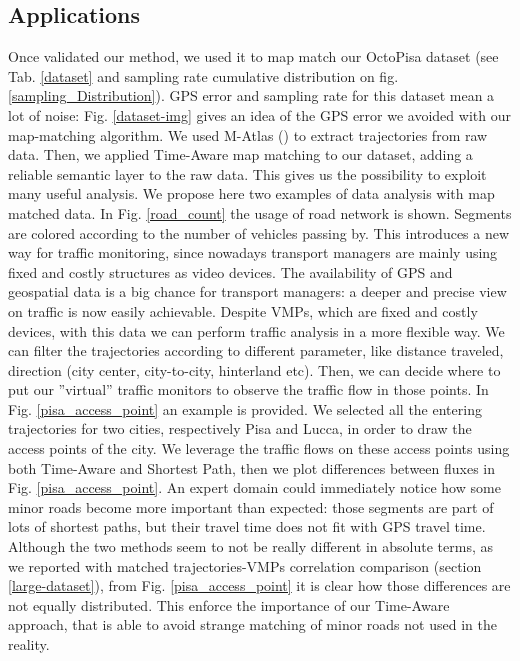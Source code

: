 \documentclass[5p]{elsarticle}
\begin{document}
\subsection{Applications}

Once validated our method, we used it to map match our OctoPisa dataset (see Tab. \ref{dataset} and sampling rate cumulative distribution on fig.
\ref{sampling_Distribution}). GPS error and sampling rate for this dataset mean a lot of noise: Fig. \ref{dataset-img} gives an idea of the GPS error we avoided with our map-matching algorithm.
We used M-Atlas (\cite{trasarti2010exploring}) to extract trajectories from raw data. Then, we applied Time-Aware map matching to our dataset, adding a reliable semantic layer to the raw data. This gives us the possibility to exploit many useful analysis. 
We propose here two examples of data analysis with map matched data.
In Fig. \ref{road_count} the usage of road network is shown. Segments are colored according to the number of vehicles passing by. 
This introduces a new way for traffic monitoring, since nowadays transport managers are mainly using fixed and costly structures as video devices. 
The availability of GPS and geospatial data is a big chance for transport managers: a deeper and precise view on traffic is now easily achievable. 
Despite VMPs, which are fixed and costly devices,
with this data we can perform traffic analysis in a more flexible way. We can filter the trajectories according to different parameter, like distance traveled, direction (city center, city-to-city, hinterland etc). Then,
we can decide where to put our ''virtual'' traffic monitors to observe the traffic flow in those points. In Fig. \ref{pisa_access_point}  an 
example is provided. 
We selected all the entering trajectories for two cities, 
respectively Pisa and Lucca, in order to draw the access points of the city. We leverage the traffic flows on these access points using both 
Time-Aware and Shortest Path, then we plot differences between fluxes in Fig. \ref{pisa_access_point}.
An expert domain could immediately notice how some minor roads become more important than expected: those segments are part of lots of 
shortest paths, but
their travel time does not fit with GPS travel time. Although the two methods seem to not be really different 
in absolute terms, as we reported with matched trajectories-VMPs correlation comparison (section \ref{large-dataset}), from Fig. \ref{pisa_access_point} it is clear how those differences are not equally distributed. This enforce the importance of our Time-Aware approach, that is 
able to avoid strange matching of minor roads not used in the reality.  \\
\end{document}
